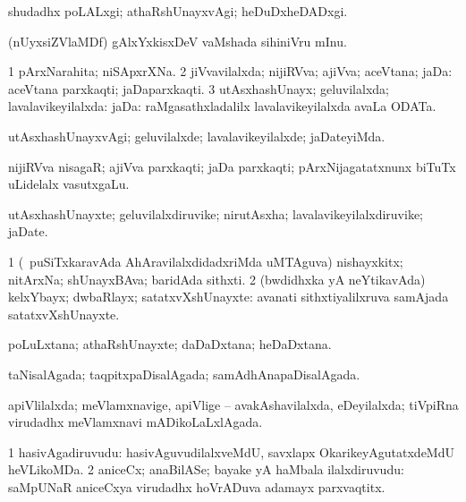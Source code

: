 \bentry
{}
\gl{\kirxvi}
\bmng
shudadhx poLALxgi; athaRshUnayxvAgi; heDuDxheDADxgi. 
\emng
\eentry

\bentry
{}
\gl{\nA}
\bmng
(nUyxsiZVlaMDf) gAlxYxkisxDeV vaMshada sihiniVru mInu. 
\emng
\eentry

\bentry
{}
\gl{\gu}
\bmng
\bnum
\num{1} pArxNarahita; niSApxrXNa. 
\num{2} jiVvavilalxda; nijiRVva; ajiVva; aceVtana; jaDa:  aceVtana parxkaqti; jaDaparxkaqti. 
\num{3} utAsxhashUnayx; geluvilalxda; lavalavikeyilalxda: jaDa:  raMgasathxladalilx lavalavikeyilalxda avaLa ODATa. 
\enum
\emng
\eentry

\bentry
{}
\gl{\kirxvi}
\bmng
utAsxhashUnayxvAgi; geluvilalxde; lavalavikeyilalxde; jaDateyiMda. 
\emng
\eentry

\bentry
{}
\gl{\nA}
\bmng
nijiRVva nisagaR; ajiVva parxkaqti; jaDa parxkaqti; pArxNijagatatxnunx biTuTx uLidelalx vasutxgaLu. 
\emng
\eentry

\bentry
{}
\gl{\nA}
\bmng
utAsxhashUnayxte; geluvilalxdiruvike; nirutAsxha; lavalavikeyilalxdiruvike; jaDate. 
\emng
\eentry

\bentry
{}
\gl{\nA}
\bmng
\bnum
\num{1} (\kanmu\ puSiTxkaravAda AhAravilalxdidadxriMda uMTAguva) nishayxkitx; nitArxNa; shUnayxBAva; baridAda sithxti. 
\num{2} (bwdidhxka yA neYtikavAda) kelxYbayx; dwbaRlayx; satatxvXshUnayxte:  avanati sithxtiyalilxruva samAjada satatxvXshUnayxte. 
\enum
\emng
\eentry

\bentry
{}
\gl{\nA}
\bmng
poLuLxtana; athaRshUnayxte; daDaDxtana; heDaDxtana. 
\emng
\eentry

\bentry
{}
\gl{\gu}
\bmng
taNisalAgada; taqpitxpaDisalAgada; samAdhAnapaDisalAgada. 
\emng
\eentry

\bentry
{}
\gl{\gu}
\bmng
apiVlilalxda; meVlamxnavige, apiVlige -- avakAshavilalxda, eDeyilalxda; tiVpiRna virudadhx meVlamxnavi mADikoLaLxlAgada. 
\emng
\eentry

\bentry
{}
\gl{\nA}
\bmng
\bnum
\num{1} hasivAgadiruvudu:  hasivAguvudilalxveMdU, savxlapx OkarikeyAgutatxdeMdU heVLikoMDa. 
\num{2} aniceCx; anaBilASe; bayake yA haMbala ilalxdiruvudu:  saMpUNaR aniceCxya virudadhx hoVrADuva adamayx parxvaqtitx. 
\enum
\emng
\eentry

